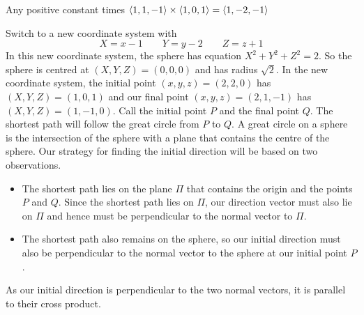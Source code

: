 %

\begin{answer}
Any positive constant times
$\left< 1,1,-1\right>\times\left< 1,0,1\right>
=\left< 1, -2, -1\right>$
\end{answer}

\begin{solution}
Switch to a new coordinate system with
$$
X=x-1\qquad Y=y-2\qquad Z=z+1
$$
In this new coordinate system, the sphere has equation $X^2+Y^2+Z^2=2$.
So the sphere is centred at $(X,Y,Z)=(0,0,0)$ and has radius $\sqrt{2}$.
In the new coordinate system, the initial point $(x,y,z)=(2,2,0)$
has $(X,Y,Z)=(1,0,1)$ and our final point  $(x,y,z)=(2,1,-1)$
has $(X,Y,Z)=(1,-1,0)$. Call the initial point $P$ and the final point
$Q$. The shortest path will follow the great circle from $P$ to $Q$.
%
A great circle on a sphere is the intersection of the sphere with a plane
that contains the centre of the sphere. Our strategy for finding the initial
direction will be based on two observations.
\begin{itemize}
\item The shortest path lies on the plane $\Pi$ that contains the origin and the points $P$ and $Q$. Since the shortest path lies on $\Pi$,
our direction vector must also lie on $\Pi$ and hence must
be perpendicular to the normal vector to $\Pi$.
\item
The shortest path also remains on the sphere, so our initial direction
must also be perpendicular to the normal vector to 
the sphere at our initial point $P$. 
\end{itemize}
As our initial direction is perpendicular to the two normal vectors,
it is parallel to their cross product.


\end{solution}

